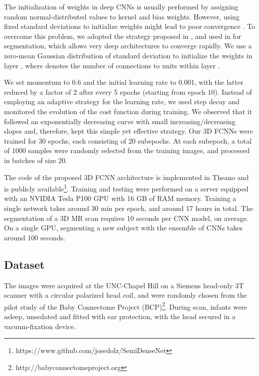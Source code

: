 \documentclass[twoside,espcrc2]{elsarticle}
\begin{document}
The initialization of weights in deep CNNs is usually performed by assigning random normal-distributed values to kernel and bias weights. However, using fixed standard deviations to initialize weights might lead to poor convergence \cite{simonyan2014very}. To overcome this problem, we adopted the strategy proposed in \cite{he2015delving}, and used in \cite{DolzNeuro2017,kamnitsas2017efficient} for segmentation, which allows very deep architectures to converge rapidly. We use a zero-mean Gaussian distribution of standard deviation  to initialize the weights in layer , where  denotes the number of connections to units within layer . 
 
We set momentum to 0.6 and the initial learning rate to 0.001, with the latter reduced by a factor of 2 after every 5 epochs (starting from epoch 10). 
Instead of employing an adaptive strategy for the learning rate, we used step decay and monitored the evolution of the cost function during training. 
We observed that it followed an exponentially decreasing curve with small increasing/decreasing slopes and, therefore, kept this simple yet effective strategy. 
Our 3D FCNNs were trained for 30 epochs, each consisting of 20 subepochs. At each subepoch, a total of 1000 samples were randomly selected from the training images, and processed in batches of size 20.





The code of the proposed 3D FCNN architecture is implemented in Theano \cite{bergstra2010theano} and is publicly available\footnote{https://www.github.com/josedolz/SemiDenseNet}. Training and testing were performed on a server equipped with an NVIDIA Tesla P100 GPU with 16 GB of RAM memory. Training a single network takes around 30 min per epoch, and around 17 hours in total. The segmentation of a 3D MR scan requires 10 seconds per CNN model, on average. On a single GPU, segmenting a new subject with the ensemble of CNNs takes around 100 seconds.

\subsection{Dataset}

The images were acquired at the UNC-Chapel Hill on a Siemens head-only 3T scanner with a circular polarized head coil, and were randomly chosen from the pilot study of the Baby Connectome Project (BCP)\footnote{http://babyconnectomeproject.org}. During scan, infants were asleep, unsedated and fitted with ear protection, with the head secured in a vacuum-fixation device.
\end{document}
